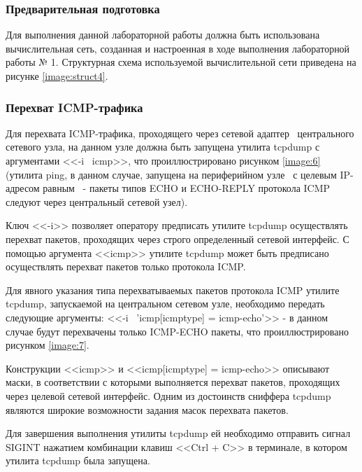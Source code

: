 
\subsubsection{Предварительная подготовка}

Для выполнения данной лабораторной работы должна быть использована вычислительная сеть, созданная и настроенная в ходе
выполнения лабораторной работы № 1. Структурная схема используемой вычислительной сети приведена на рисунке
\ref{image:struct4}.


\subsubsection{Перехват ICMP-трафика}
\label{task:l4t1}

	Для перехвата ICMP-трафика, проходящего через сетевой адаптер \midethf\ центрального сетевого узла,
	на данном узле должна быть запущена утилита tcpdump с аргументами <<-i \midethf\ icmp>>, что проиллюстрировано
	рисунком \ref{image:6} (утилита ping, в данном случае, запущена на периферийном узле \first\ с целевым IP-адресом
	равным \second\ - пакеты типов ECHO и ECHO-REPLY протокола ICMP следуют через центральный сетевой узел).
	
	Ключ <<-i>> позволяет оператору предписать утилите tcpdump осуществлять перехват пакетов, проходящих через строго
	определенный сетевой интерфейс. С помощью аргумента <<icmp>> утилите tcpdump может быть предписано осуществлять
	перехват пакетов только протокола ICMP.

	Для явного указания типа перехватываемых пакетов протокола ICMP утилите tcpdump, запускаемой на центральном сетевом
	узле, необходимо передать следующие аргументы: <<-i \midethf\ 'icmp[icmptype] = icmp-echo'>> - в данном случае
	будут перехвачены только ICMP-ECHO пакеты, что проиллюстрировано рисунком \ref{image:7}.

	Конструкции <<icmp>> и <<icmp[icmptype] = icmp-echo>> описывают маски, в соответствии с которыми выполняется
	перехват пакетов, проходящих через целевой сетевой интерфейс. Одним из достоинств сниффера tcpdump являются широкие
	возможности задания масок перехвата пакетов.
	
	Для завершения выполнения утилиты tcpdump ей необходимо отправить сигнал SIGINT нажатием комбинации клавиш
	<<Ctrl + C>> в терминале, в котором утилита tcpdump была запущена.


